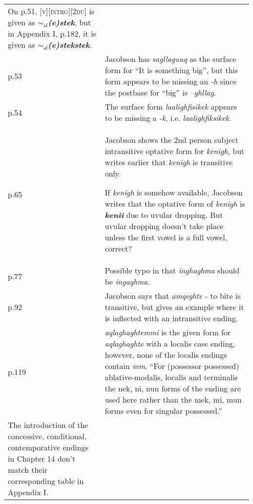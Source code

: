\documentclass{article}
\begin{document}
\begin{tabular}{p{1cm}p{10.5cm}}
On p.51, \textsc{[v][intrg][2du]} is given as \textit{\textbf{$\sim_\text{sf}$(e)stek}}, but in Appendix I, p.182, it is given as \textit{\textbf{$\sim_\text{sf}$(e)stekstek}}. \\

p.53 & Jacobson has \textit{sagllaguuq} as the surface form for ``It is something big'', but this form appears to be missing an \textit{-h} since the postbase for ``big'' is \textit{--ghllag}. \\

p.54 & The surface form \textit{laalighfisikek} appears to be missing a \textit{-k}, i.e. \textit{laalighfiksikek}. \\

p.65 & Jacobson shows the 2nd person subject intransitive optative form for \textit{kenigh}, but writes earlier that \textit{kenigh} is transitive only.

If \textit{kenigh} is somehow available, Jacobson writes that the optative form of \textit{kenigh} is \textit{\textbf{kenii}} due to uvular dropping.
%
But uvular dropping doesn't take place unless the first vowel is a full vowel, correct? \\

p.77 & Possible typo in that \textit{inghaghma} should be \textit{ingaghma}. \\

p.92 & Jacobson says that \textit{amqeghte} - to bite is transitive, but gives an example where it is inflected with an intransitive ending. \\

p.119 & \textit{aqlaghaghtemmi} is the given form for \textit{aqlaghaghte} with a localis case ending, however, none of the localis endings contain \textit{mm}.
%
``For (possessor possessed) ablative-modalis, localis and terminalis the nek, ni, nun forms of the ending are used here rather than the mek, mi, mun forms even for singular possessed.'' \\

The introduction of the concessive, conditional, contemporative endings in Chapter 14 don't match their corresponding table in Appendix I.

\end{tabular}


\end{document}
